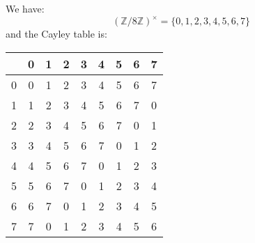 \begin{sol}
    We have:
    \begin{equation}
        (\mathbb{Z}/8\mathbb{Z})^\times = \{0,1,2,3,4,5,6,7\}
    \end{equation}
    and the Cayley table is:
    \begin{center}
        \begin{tabular}{c|cccccccc}
            \cline{2-9}
                                    & \multicolumn{1}{c|}{0} & \multicolumn{1}{c|}{1} & \multicolumn{1}{c|}{2} & \multicolumn{1}{c|}{3} & \multicolumn{1}{c|}{4} & \multicolumn{1}{c|}{5} & \multicolumn{1}{c|}{6} & \multicolumn{1}{c|}{7} \\ \hline
            \multicolumn{1}{|c|}{0} & 0                      & 1                      & 2                      & 3                      & 4                      & 5                      & 6                      & 7                      \\ \cline{1-1}
            \multicolumn{1}{|c|}{1} & 1                      & 2                      & 3                      & 4                      & 5                      & 6                      & 7                      & 0                      \\ \cline{1-1}
            \multicolumn{1}{|c|}{2} & 2                      & 3                      & 4                      & 5                      & 6                      & 7                      & 0                      & 1                      \\ \cline{1-1}
            \multicolumn{1}{|c|}{3} & 3                      & 4                      & 5                      & 6                      & 7                      & 0                      & 1                      & 2                      \\ \cline{1-1}
            \multicolumn{1}{|c|}{4} & 4                      & 5                      & 6                      & 7                      & 0                      & 1                      & 2                      & 3                      \\ \cline{1-1}
            \multicolumn{1}{|c|}{5} & 5                      & 6                      & 7                      & 0                      & 1                      & 2                      & 3                      & 4                      \\ \cline{1-1}
            \multicolumn{1}{|c|}{6} & 6                      & 7                      & 0                      & 1                      & 2                      & 3                      & 4                      & 5                      \\ \cline{1-1}
            \multicolumn{1}{|c|}{7} & 7                      & 0                      & 1                      & 2                      & 3                      & 4                      & 5                      & 6                      \\ \cline{1-1}
            \end{tabular}
    \end{center}
\end{sol}